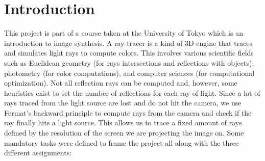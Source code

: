 \documentclass[acmsmall]{acmart}
\begin{document}
\section*{Introduction}
This project is part of a course taken at the University of Tokyo which is an introduction to image synthesis.
A ray-tracer is a kind of 3D engine that traces and simulates light rays to compute colors. 
This involves various scientific fields such as Euclidean geometry (for rays intersections and reflections with objects), photometry (for color computations), and computer sciences (for computational optimization).
Not all reflection rays can be computed and, however, some heuristics exist to set the number of reflections for each ray of light.
Since a lot of rays traced from the light source are lost and do not hit the camera, we use Fermat's backward principle to compute rays from the camera and check if the ray finally hits a light source.
This allows us to trace a fixed amount of rays defined by the resolution of the screen we are projecting the image on.
Some mandatory tasks were defined to frame the project all along with the three different assignments:
\end{document}
